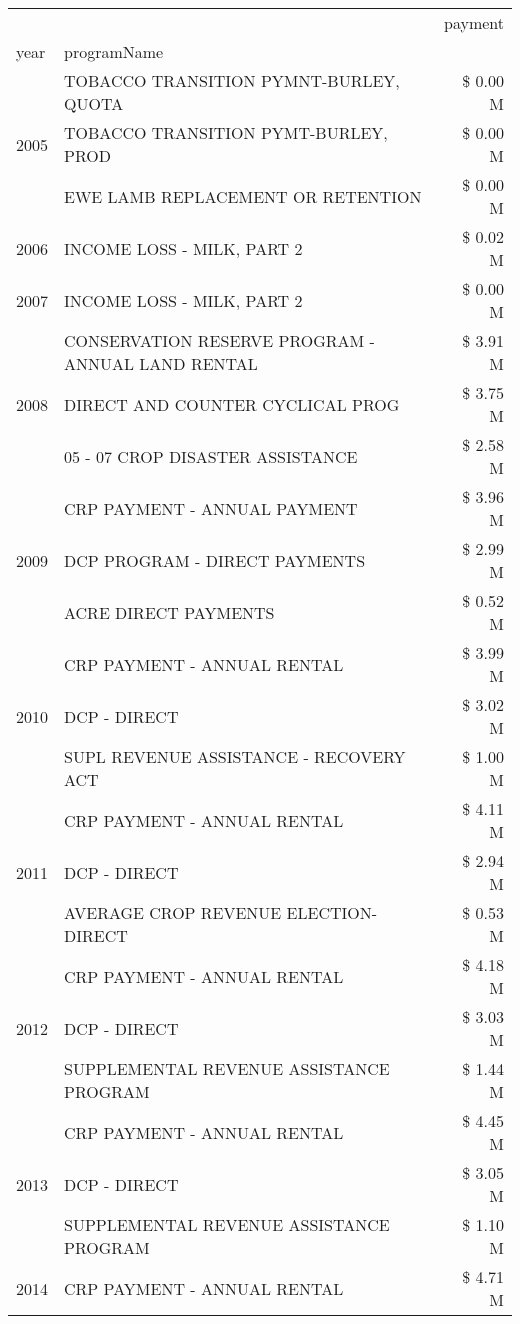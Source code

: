 \begin{tabular}{llr}
\toprule
 &  & payment \\
year & programName &  \\
\midrule
\multirow[t]{3}{*}{2005} & TOBACCO TRANSITION PYMNT-BURLEY, QUOTA & \$ 0.00 M \\
 & TOBACCO TRANSITION PYMT-BURLEY, PROD & \$ 0.00 M \\
 & EWE LAMB REPLACEMENT OR RETENTION & \$ 0.00 M \\
\cline{1-3}
2006 & INCOME LOSS - MILK, PART 2 & \$ 0.02 M \\
\cline{1-3}
2007 & INCOME LOSS - MILK, PART 2 & \$ 0.00 M \\
\cline{1-3}
\multirow[t]{3}{*}{2008} & CONSERVATION RESERVE PROGRAM - ANNUAL LAND RENTAL & \$ 3.91 M \\
 & DIRECT AND COUNTER CYCLICAL PROG & \$ 3.75 M \\
 & 05 - 07 CROP DISASTER ASSISTANCE & \$ 2.58 M \\
\cline{1-3}
\multirow[t]{3}{*}{2009} & CRP PAYMENT - ANNUAL PAYMENT & \$ 3.96 M \\
 & DCP PROGRAM - DIRECT PAYMENTS & \$ 2.99 M \\
 & ACRE DIRECT PAYMENTS & \$ 0.52 M \\
\cline{1-3}
\multirow[t]{3}{*}{2010} & CRP PAYMENT - ANNUAL RENTAL & \$ 3.99 M \\
 & DCP - DIRECT & \$ 3.02 M \\
 & SUPL REVENUE ASSISTANCE - RECOVERY ACT & \$ 1.00 M \\
\cline{1-3}
\multirow[t]{3}{*}{2011} & CRP PAYMENT - ANNUAL RENTAL & \$ 4.11 M \\
 & DCP - DIRECT & \$ 2.94 M \\
 & AVERAGE CROP REVENUE ELECTION-DIRECT & \$ 0.53 M \\
\cline{1-3}
\multirow[t]{3}{*}{2012} & CRP PAYMENT - ANNUAL RENTAL & \$ 4.18 M \\
 & DCP - DIRECT & \$ 3.03 M \\
 & SUPPLEMENTAL REVENUE ASSISTANCE PROGRAM & \$ 1.44 M \\
\cline{1-3}
\multirow[t]{3}{*}{2013} & CRP PAYMENT - ANNUAL RENTAL & \$ 4.45 M \\
 & DCP - DIRECT & \$ 3.05 M \\
 & SUPPLEMENTAL REVENUE ASSISTANCE PROGRAM & \$ 1.10 M \\
\cline{1-3}
\multirow[t]{3}{*}{2014} & CRP PAYMENT - ANNUAL RENTAL & \$ 4.71 M \\

\end{tabular}
